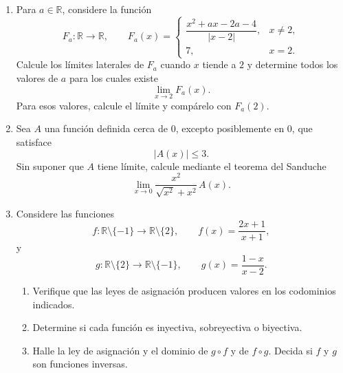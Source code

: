 \documentclass[10pt,a5paper]{article}
\begin{document}
\begin{ejercicios}
\begin{enumerate}
  \item Para $a\in\mathbb{R}$, considere la función
  \[
    F_a\colon\mathbb{R}\to\mathbb{R},
    \qquad
    F_a(x)=
    \begin{cases}
      \dfrac{x^2+ax-2a-4}{|x-2|}, & x\neq2,\\[2mm]
      7, & x=2.
    \end{cases}
  \]
  Calcule los límites laterales de $F_a$ cuando $x$ tiende a $2$ y determine
  todos los valores de $a$ para los cuales existe
  \[
    \lim_{x\to2}F_a(x).
  \]
  Para esos valores, calcule el límite y compárelo con $F_a(2)$.

  \item Sea $A$ una función definida cerca de $0$, excepto posiblemente en
  $0$, que satisface
  \[
    |A(x)|\leq3.
  \]
  Sin suponer que $A$ tiene límite, calcule mediante el teorema del Sanduche
  \[
    \lim_{x\to0}
    \frac{x^2}{\sqrt{x^2}+x^2}\,A(x).
  \]

  \item Considere las funciones
  \[
    f\colon\mathbb{R}\setminus\{-1\}
    \to\mathbb{R}\setminus\{2\},
    \qquad
    f(x)=\frac{2x+1}{x+1},
  \]
  y
  \[
    g\colon\mathbb{R}\setminus\{2\}
    \to\mathbb{R}\setminus\{-1\},
    \qquad
    g(x)=\frac{1-x}{x-2}.
  \]
  \begin{enumerate}
    \item Verifique que las leyes de asignación producen valores en los
    codominios indicados.
    \item Determine si cada función es inyectiva, sobreyectiva o biyectiva.
    \item Halle la ley de asignación y el dominio de $g\circ f$ y de
    $f\circ g$. Decida si $f$ y $g$ son funciones inversas.
  \end{enumerate}
\end{enumerate}
\end{ejercicios}
\end{document}
